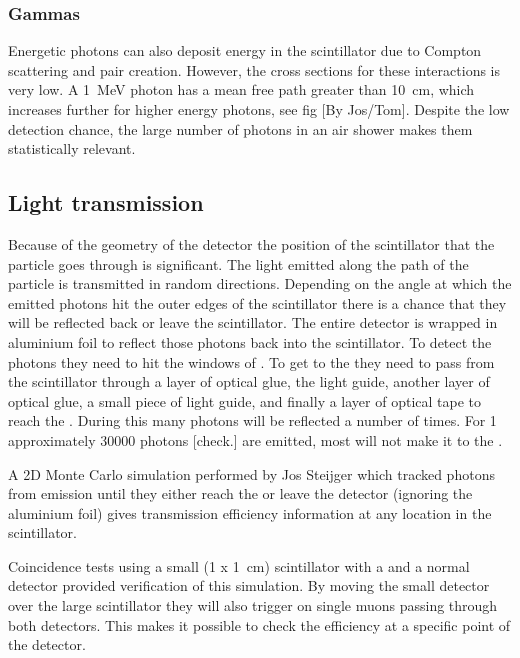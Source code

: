 \subsubsection{Gammas}


Energetic photons can also deposit energy in the scintillator due to
Compton scattering and pair creation. However, the cross sections for
these interactions is very low. A \SI{1}{\mega\electronvolt} photon  has
a mean free path greater than \SI{10}{\centi\meter}, which increases
further for higher energy photons, see fig [By Jos/Tom]. Despite the low
detection chance, the large number of photons in an air shower makes
them statistically relevant.


\subsection{Light transmission}

Because of the geometry of the detector the position of the scintillator
that the particle goes through is significant. The light emitted along
the path of the particle is transmitted in random directions. Depending
on the angle at which the emitted photons hit the outer edges of the
scintillator there is a chance that they will be reflected back or leave
the scintillator. The entire detector is wrapped in aluminium foil 
to reflect those photons back into the scintillator. To
detect the photons they need to hit the windows of \pmt. To get to the
\pmt they need to pass from the scintillator through a layer of optical
glue, the light guide, another layer of optical glue, a small piece of
light guide, and finally a layer of optical tape to reach the \pmt.
During this many photons will be reflected a number of times. For
\SI{1}{\mip} approximately 30000 photons [check.] are emitted, most will
not make it to the \pmt.

A 2D Monte Carlo simulation performed by Jos Steijger which tracked
photons from emission until they either reach the \pmt or leave the
detector (ignoring the aluminium foil) gives transmission efficiency
information at any location in the scintillator.

Coincidence tests using a small (\SI[product-units = repeat]{1 x
1}{\centi\meter}) scintillator with a \pmt and a normal \hisparc
detector provided verification of this simulation. By moving the small
detector over the large scintillator they will also trigger on single
muons passing through both detectors. This makes it possible to check
the efficiency at a specific point of the detector.

